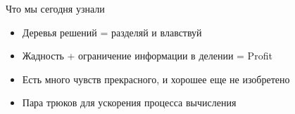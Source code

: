 \documentclass[14pt, fleqn, xcolor={dvipsnames, table}]{beamer}
\begin{document}
\begin{frame}{Что мы сегодня узнали}
\begin{itemize}
  \item Деревья решений = разделяй и влавствуй
  \item Жадность + ограничение информации в делении = Profit
  \item Есть много чувств прекрасного, и хорошее еще не изобретено
  \item Пара трюков для ускорения процесса вычисления
\end{itemize}
\end{frame}
\end{document}
